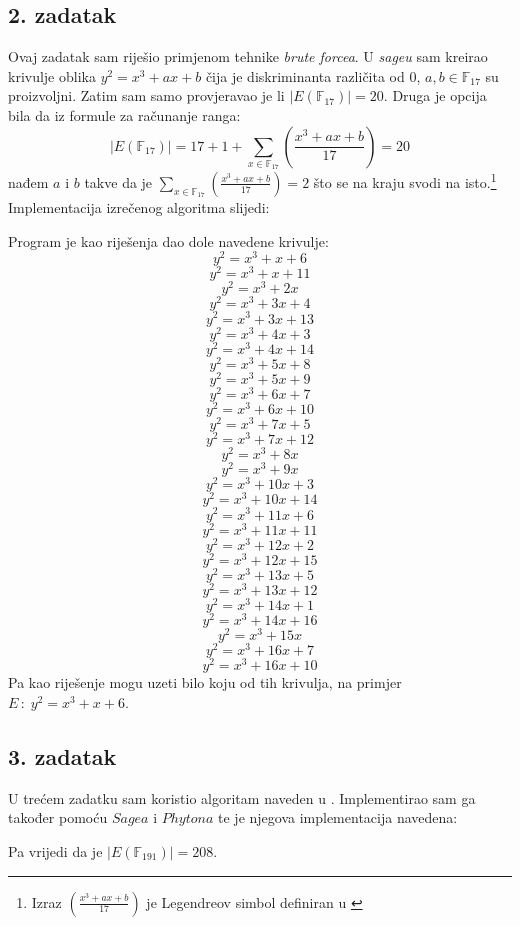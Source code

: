 \documentclass[12pt, a4paper]{article}
\begin{document}
\begin{spacing}{1.5}
\subsection{2. zadatak}
Ovaj zadatak sam riješio primjenom tehnike \textit{brute forcea}. U \textit{sageu} sam kreirao krivulje oblika $y^2=x^3+ax+b$ čija je diskriminanta različita od 0, $a,b \in \mathbb{F}_{17}$ su proizvoljni. Zatim sam samo provjeravao je li $|E(\mathbb{F}_{17})|=20$. Druga je opcija bila da iz formule za računanje ranga:
\[|E(\mathbb{F}_{17})|=17+1+\sum_{x \in \mathbb{F}_{17}} \left( \frac{x^3+ax+b}{17} \right)=20\]
nađem $a$ i $b$ takve da je $\sum_{x \in \mathbb{F}_{17}} \left( \frac{x^3+ax+b}{17} \right)=2$ što se na kraju svodi na isto.\footnote{Izraz  $\left( \frac{x^3+ax+b}{17} \right)$ je Legendreov simbol definiran u \cite[s. ~29]{utb}} Implementacija izrečenog algoritma slijedi:

Program je kao riješenja dao dole navedene krivulje:
\[y^2 = x^3 + x + 6\]
\[y^2 = x^3 + x + 11\]
\[y^2 = x^3 + 2x\]
\[y^2 = x^3 + 3x + 4\]
\[y^2 = x^3 + 3x + 13\]
\[y^2 = x^3 + 4x + 3\]
\[y^2 = x^3 + 4x + 14\]
\[y^2 = x^3 + 5x + 8\]
\[y^2 = x^3 + 5x + 9\]
\[y^2 = x^3 + 6x + 7\]
\[y^2 = x^3 + 6x + 10\]
\[y^2 = x^3 + 7x + 5\]
\[y^2 = x^3 + 7x + 12\]
\[y^2 = x^3 + 8x\]
\[y^2 = x^3 + 9x\]
\[y^2 = x^3 + 10x + 3\]
\[y^2 = x^3 + 10x + 14\]
\[y^2 = x^3 + 11x + 6\]
\[y^2 = x^3 + 11x + 11\]
\[y^2 = x^3 + 12x + 2\]
\[y^2 = x^3 + 12x + 15\]
\[y^2 = x^3 + 13x + 5\]
\[y^2 = x^3 + 13x + 12\]
\[y^2 = x^3 + 14x + 1\]
\[y^2 = x^3 + 14x + 16\]
\[y^2 = x^3 + 15x\]
\[y^2 = x^3 + 16x + 7\]
\[y^2 = x^3 + 16x + 10\]
Pa kao riješenje mogu uzeti bilo koju od tih krivulja, na primjer $E \, : \; y^2=x^3+x+6$.
\newpage
\subsection{3. zadatak}
U trećem zadatku sam koristio algoritam naveden u \cite[s. ~60]{ekk}. Implementirao sam ga također pomoću $Sagea$ i $Phytona$ te je njegova implementacija navedena:

Pa vrijedi da je $|E(\mathbb{F}_{191})|=208$.
 

\end{spacing}
\newpage
\nocite{*}


\end{document}
